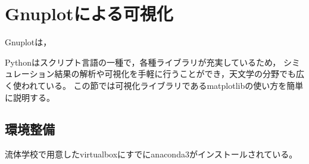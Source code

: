 \chapter{ Gnuplotによる可視化}

Gnuplotは，

Pythonはスクリプト言語の一種で，各種ライブラリが充実しているため，
シミュレーション結果の解析や可視化を手軽に行うことができ，天文学の分野でも広く使われている。
この節では可視化ライブラリであるmatplotlibの使い方を簡単に説明する。


\section{環境整備}

流体学校で用意した{\ttfamily virtualbox}にすでに{\ttfamily anaconda3}がインストールされている。


